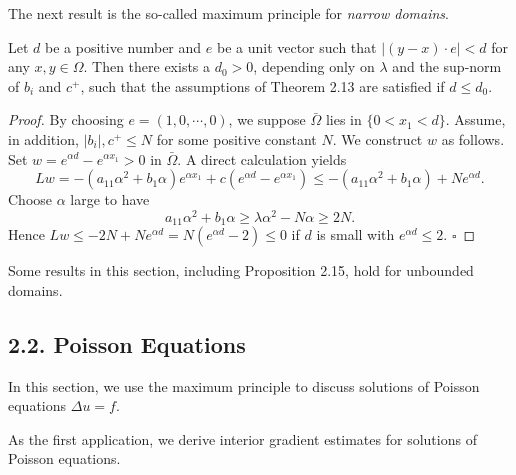The next result is the so-called maximum principle for \emph{narrow domains}.

\begin{proposition}\label{hanlin:maxprin-prop-2-15}
Let $d$ be a positive number and $e$ be a unit vector such that
$|(y-x)\cdot e|<d$ for any $x,y\in\Omega$. Then there exists a $d_0>0$, depending only on
$\lambda$ and the sup-norm of $b_i$ and $c^+$, such that the assumptions of Theorem 2.13 are
satisfied if $d\le d_0$.
\end{proposition}
\begin{proof}
\sketch
By choosing $e=(1,0,\cdots,0)$, we suppose $\bar{\Omega}$ lies in $\{0<x_1<d\}$. Assume, in addition,
$|b_i|,c^+\le N$ for some positive constant $N$. We construct $w$ as
follows. Set $w=e^{\alpha d}-e^{\alpha x_1}>0$ in $\bar{\Omega}$. A direct calculation yields
\[
Lw=-(a_{11}\alpha^2+b_1\alpha)e^{\alpha x_1}+c(e^{\alpha d}-e^{\alpha x_1})
\le -(a_{11}\alpha^2+b_1\alpha)+Ne^{\alpha d}.
\]
Choose $\alpha$ large to have
\[
a_{11}\alpha^2+b_1\alpha\ge \lambda\alpha^2-N\alpha\ge 2N.
\]
Hence $Lw\le -2N+Ne^{\alpha d}=N(e^{\alpha d}-2)\le 0$ if $d$ is small with $e^{\alpha d}\le 2$.
\hfill$\square$
\end{proof}

\begin{remark}\label{hanlin:maxprin-remark-2-16}
Some results in this section, including Proposition 2.15, hold
for unbounded domains.
\end{remark}

\subsection*{2.2. Poisson Equations}

In this section, we use the maximum principle to discuss solutions of Poisson
equations $\Delta u=f$.

As the first application, we derive interior gradient estimates for solutions of
Poisson equations.

